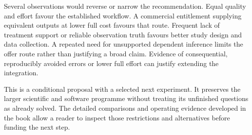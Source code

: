 Several observations would reverse or narrow the recommendation. Equal
quality and effort favour the established workflow. A commercial
entitlement supplying equivalent outputs at lower full cost favours
that route. Frequent lack of treatment support or reliable observation
truth favours better study design and data collection. A repeated
need for unsupported dependent inference limits the offer route rather
than justifying a broad claim. Evidence of consequential, reproducibly
avoided errors or lower full effort can justify extending the integration.

This is a conditional proposal with a selected next experiment. It
preserves the larger scientific and software programme without treating
its unfinished questions as already solved. The detailed comparisons
and operating evidence developed in the book allow a reader to inspect those
restrictions and alternatives before funding the next step.
